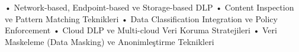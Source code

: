 • Network-based, Endpoint-based ve Storage-based DLP
• Content Inspection ve Pattern Matching Teknikleri
• Data Classification Integration ve Policy Enforcement
• Cloud DLP ve Multi-cloud Veri Koruma Stratejileri
• Veri Maskeleme (Data Masking) ve Anonimleştirme Teknikleri